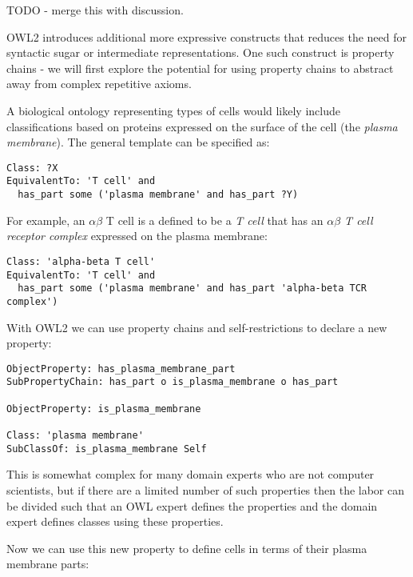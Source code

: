 \documentclass[11pt]{article}
\begin{document}
TODO - merge this with discussion.

OWL2 introduces additional more expressive constructs that reduces the
need for syntactic sugar or intermediate representations. One such
construct is property chains - we will first explore the potential for
using property chains to abstract away from complex repetitive axioms.

A biological ontology representing types of cells would likely include
classifications based on proteins expressed on the surface of the cell
(the \emph{plasma membrane}). The general template can be specified
as:

\begin{verbatim}
Class: ?X
EquivalentTo: 'T cell' and 
  has_part some ('plasma membrane' and has_part ?Y)
\end{verbatim}

For example, an $\alpha \beta$ T cell is a defined to be a \emph{T
  cell} that has an \emph{$\alpha\beta$ T cell receptor complex}
expressed on the plasma membrane:

\begin{verbatim}
Class: 'alpha-beta T cell'
EquivalentTo: 'T cell' and 
  has_part some ('plasma membrane' and has_part 'alpha-beta TCR complex')
\end{verbatim}

With OWL2 we can use property chains and self-restrictions to declare
a new property:

\begin{verbatim}
ObjectProperty: has_plasma_membrane_part 
SubPropertyChain: has_part o is_plasma_membrane o has_part

ObjectProperty: is_plasma_membrane

Class: 'plasma membrane'
SubClassOf: is_plasma_membrane Self
\end{verbatim}


This is somewhat complex for many domain experts who are not computer
scientists, but if there are a limited number of such properties then
the labor can be divided such that an OWL expert defines the
properties and the domain expert defines classes using these properties.

Now we can use this new property to define cells in terms of their
plasma membrane parts:
\end{document}
